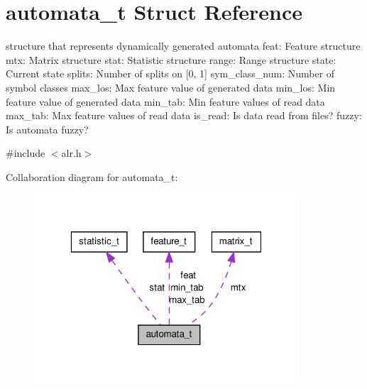 \hypertarget{structautomata__t}{\section{automata\-\_\-t Struct Reference}
\label{structautomata__t}
}


structure that represents dynamically generated automata feat\-: Feature structure mtx\-: Matrix structure stat\-: Statistic structure range\-: Range structure state\-: Current state splits\-: Number of splits on \mbox{[}0, 1\mbox{]} sym\-\_\-class\-\_\-num\-: Number of symbol classes max\-\_\-los\-: Max feature value of generated data min\-\_\-los\-: Min feature value of generated data min\-\_\-tab\-: Min feature values of read data max\-\_\-tab\-: Max feature values of read data is\-\_\-read\-: Is data read from files? fuzzy\-: Is automata fuzzy?  




{\ttfamily \#include $<$alr.\-h$>$}



Collaboration diagram for automata\-\_\-t\-:\nopagebreak
\begin{figure}[H]
\begin{center}
\leavevmode
\includegraphics[width=280pt]{structautomata__t__coll__graph}
\end{center}
\end{figure}
